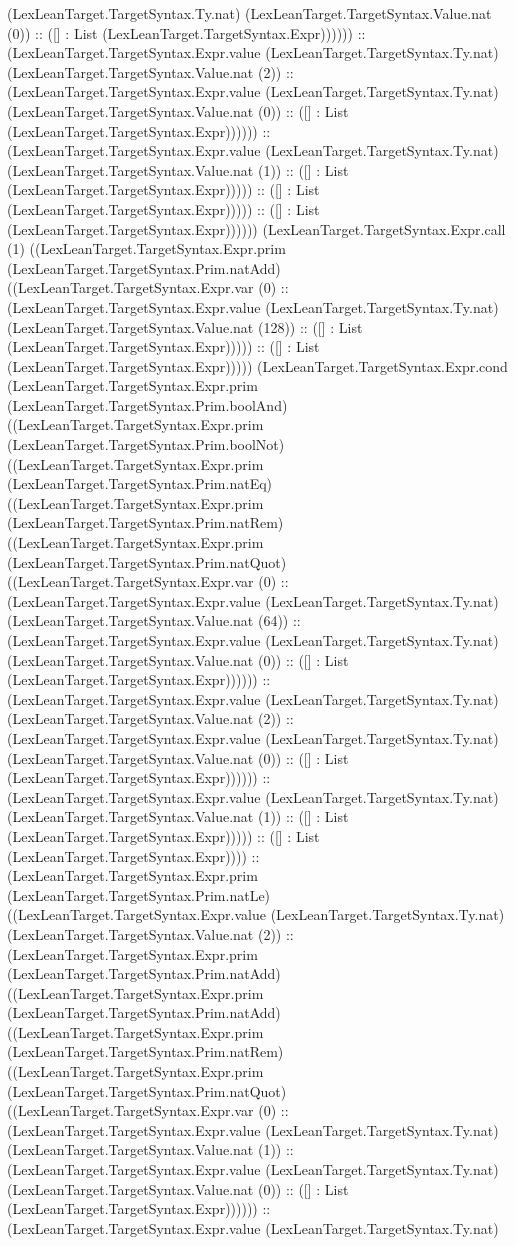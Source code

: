 \documentclass[11pt]{article}
\begin{document}
(LexLeanTarget.TargetSyntax.Ty.nat) (LexLeanTarget.TargetSyntax.Value.nat (0)) :: ([] : List (LexLeanTarget.TargetSyntax.Expr)))))) :: (LexLeanTarget.TargetSyntax.Expr.value (LexLeanTarget.TargetSyntax.Ty.nat) (LexLeanTarget.TargetSyntax.Value.nat (2)) :: (LexLeanTarget.TargetSyntax.Expr.value (LexLeanTarget.TargetSyntax.Ty.nat) (LexLeanTarget.TargetSyntax.Value.nat (0)) :: ([] : List (LexLeanTarget.TargetSyntax.Expr)))))) :: (LexLeanTarget.TargetSyntax.Expr.value (LexLeanTarget.TargetSyntax.Ty.nat) (LexLeanTarget.TargetSyntax.Value.nat (1)) :: ([] : List (LexLeanTarget.TargetSyntax.Expr))))) :: ([] : List (LexLeanTarget.TargetSyntax.Expr))))) :: ([] : List (LexLeanTarget.TargetSyntax.Expr)))))) (LexLeanTarget.TargetSyntax.Expr.call (1) ((LexLeanTarget.TargetSyntax.Expr.prim (LexLeanTarget.TargetSyntax.Prim.natAdd) ((LexLeanTarget.TargetSyntax.Expr.var (0) :: (LexLeanTarget.TargetSyntax.Expr.value (LexLeanTarget.TargetSyntax.Ty.nat) (LexLeanTarget.TargetSyntax.Value.nat (128)) :: ([] : List (LexLeanTarget.TargetSyntax.Expr))))) :: ([] : List (LexLeanTarget.TargetSyntax.Expr))))) (LexLeanTarget.TargetSyntax.Expr.cond (LexLeanTarget.TargetSyntax.Expr.prim (LexLeanTarget.TargetSyntax.Prim.boolAnd) ((LexLeanTarget.TargetSyntax.Expr.prim (LexLeanTarget.TargetSyntax.Prim.boolNot) ((LexLeanTarget.TargetSyntax.Expr.prim (LexLeanTarget.TargetSyntax.Prim.natEq) ((LexLeanTarget.TargetSyntax.Expr.prim (LexLeanTarget.TargetSyntax.Prim.natRem) ((LexLeanTarget.TargetSyntax.Expr.prim (LexLeanTarget.TargetSyntax.Prim.natQuot) ((LexLeanTarget.TargetSyntax.Expr.var (0) :: (LexLeanTarget.TargetSyntax.Expr.value (LexLeanTarget.TargetSyntax.Ty.nat) (LexLeanTarget.TargetSyntax.Value.nat (64)) :: (LexLeanTarget.TargetSyntax.Expr.value (LexLeanTarget.TargetSyntax.Ty.nat) (LexLeanTarget.TargetSyntax.Value.nat (0)) :: ([] : List (LexLeanTarget.TargetSyntax.Expr)))))) :: (LexLeanTarget.TargetSyntax.Expr.value (LexLeanTarget.TargetSyntax.Ty.nat) (LexLeanTarget.TargetSyntax.Value.nat (2)) :: (LexLeanTarget.TargetSyntax.Expr.value (LexLeanTarget.TargetSyntax.Ty.nat) (LexLeanTarget.TargetSyntax.Value.nat (0)) :: ([] : List (LexLeanTarget.TargetSyntax.Expr)))))) :: (LexLeanTarget.TargetSyntax.Expr.value (LexLeanTarget.TargetSyntax.Ty.nat) (LexLeanTarget.TargetSyntax.Value.nat (1)) :: ([] : List (LexLeanTarget.TargetSyntax.Expr))))) :: ([] : List (LexLeanTarget.TargetSyntax.Expr)))) :: (LexLeanTarget.TargetSyntax.Expr.prim (LexLeanTarget.TargetSyntax.Prim.natLe) ((LexLeanTarget.TargetSyntax.Expr.value (LexLeanTarget.TargetSyntax.Ty.nat) (LexLeanTarget.TargetSyntax.Value.nat (2)) :: (LexLeanTarget.TargetSyntax.Expr.prim (LexLeanTarget.TargetSyntax.Prim.natAdd) ((LexLeanTarget.TargetSyntax.Expr.prim (LexLeanTarget.TargetSyntax.Prim.natAdd) ((LexLeanTarget.TargetSyntax.Expr.prim (LexLeanTarget.TargetSyntax.Prim.natRem) ((LexLeanTarget.TargetSyntax.Expr.prim (LexLeanTarget.TargetSyntax.Prim.natQuot) ((LexLeanTarget.TargetSyntax.Expr.var (0) :: (LexLeanTarget.TargetSyntax.Expr.value (LexLeanTarget.TargetSyntax.Ty.nat) (LexLeanTarget.TargetSyntax.Value.nat (1)) :: (LexLeanTarget.TargetSyntax.Expr.value (LexLeanTarget.TargetSyntax.Ty.nat) (LexLeanTarget.TargetSyntax.Value.nat (0)) :: ([] : List (LexLeanTarget.TargetSyntax.Expr)))))) :: (LexLeanTarget.TargetSyntax.Expr.value (LexLeanTarget.TargetSyntax.Ty.nat) 
\end{document}
